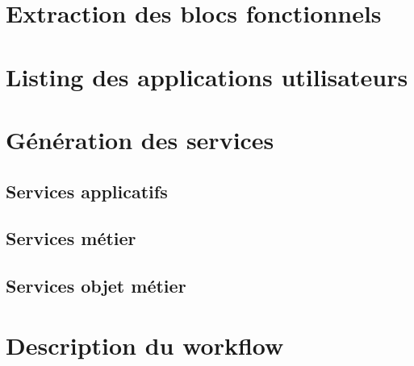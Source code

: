 \section{Extraction des blocs fonctionnels}

\section{Listing des applications utilisateurs}

\section{Génération des services}
\subsection{Services applicatifs}

\subsection{Services métier}

\subsection{Services objet métier}

\section{Description du workflow}

